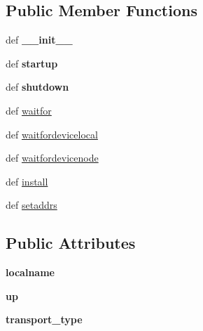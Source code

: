 \subsection*{Public Member Functions}
\begin{DoxyCompactItemize}
\item 
\hypertarget{classcore_1_1netns_1_1vif_1_1_tun_tap_a0578e736034bff4cf8ca480b92266af6}{def {\bfseries \+\_\+\+\_\+init\+\_\+\+\_\+}}\label{classcore_1_1netns_1_1vif_1_1_tun_tap_a0578e736034bff4cf8ca480b92266af6}

\item 
\hypertarget{classcore_1_1netns_1_1vif_1_1_tun_tap_a17f0657a5e6351413fc21c1880f71855}{def {\bfseries startup}}\label{classcore_1_1netns_1_1vif_1_1_tun_tap_a17f0657a5e6351413fc21c1880f71855}

\item 
\hypertarget{classcore_1_1netns_1_1vif_1_1_tun_tap_a7bab72f055c91d6d15063b59329fbdb5}{def {\bfseries shutdown}}\label{classcore_1_1netns_1_1vif_1_1_tun_tap_a7bab72f055c91d6d15063b59329fbdb5}

\item 
def \hyperlink{classcore_1_1netns_1_1vif_1_1_tun_tap_a17cef67bdd469ecec7ce987dbd1e2fa6}{waitfor}
\item 
def \hyperlink{classcore_1_1netns_1_1vif_1_1_tun_tap_a9a23f202552d077449464f0afe4a20eb}{waitfordevicelocal}
\item 
def \hyperlink{classcore_1_1netns_1_1vif_1_1_tun_tap_a4c274d40dc5008f43d07f46bbd597c50}{waitfordevicenode}
\item 
def \hyperlink{classcore_1_1netns_1_1vif_1_1_tun_tap_a6bc33d400c97bcd37feabd51eee6793c}{install}
\item 
def \hyperlink{classcore_1_1netns_1_1vif_1_1_tun_tap_a20ae8c89caa8f5bf79ada256691997df}{setaddrs}
\end{DoxyCompactItemize}
\subsection*{Public Attributes}
\begin{DoxyCompactItemize}
\item 
\hypertarget{classcore_1_1netns_1_1vif_1_1_tun_tap_a19f47a0a117795017ae4a01e8812e894}{{\bfseries localname}}\label{classcore_1_1netns_1_1vif_1_1_tun_tap_a19f47a0a117795017ae4a01e8812e894}

\item 
\hypertarget{classcore_1_1netns_1_1vif_1_1_tun_tap_ac87201a170f067655ad7b28262b33c36}{{\bfseries up}}\label{classcore_1_1netns_1_1vif_1_1_tun_tap_ac87201a170f067655ad7b28262b33c36}

\item 
\hypertarget{classcore_1_1netns_1_1vif_1_1_tun_tap_a3edcb8bf2efa8f8a10cea3540121e374}{{\bfseries transport\+\_\+type}}\label{classcore_1_1netns_1_1vif_1_1_tun_tap_a3edcb8bf2efa8f8a10cea3540121e374}

\end{DoxyCompactItemize}


